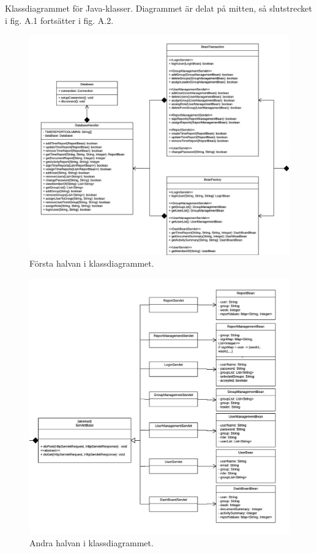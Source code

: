 \documentclass[paper=a4, fontsize=11pt,twoside]{article}
\begin{document}
Klassdiagrammet för Java-klasser. Diagrammet är delat på mitten, så slutstrecket i fig. A.1 fortsätter i fig. A.2.
\begin{figure}[H]
\centering
\includegraphics{Klassdiagram1}
\caption{Första halvan i klassdiagrammet.}
\end{figure}
\begin{figure}[H]
\centering
\includegraphics[width=14cm]{Klassdiagram2}%
\caption{Andra halvan i klassdiagrammet.}
\end{figure}
\end{document}

